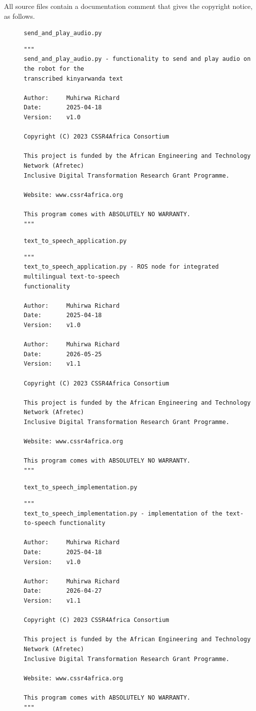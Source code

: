 \documentclass{CSSRforAfrica}
\newcommand{\checkboxChecked}{\fbox{\ding{51}}} %
\begin{document}
\noindent All source files contain a documentation comment that gives the copyright notice, as follows.

\begin{description}

\item[\checkboxChecked] {\small \verb+send_and_play_audio.py+}
{\scriptsize \begin{verbatim}
""" 
send_and_play_audio.py - functionality to send and play audio on the robot for the
transcribed kinyarwanda text

Author:     Muhirwa Richard
Date:       2025-04-18
Version:    v1.0

Copyright (C) 2023 CSSR4Africa Consortium

This project is funded by the African Engineering and Technology Network (Afretec)
Inclusive Digital Transformation Research Grant Programme.

Website: www.cssr4africa.org

This program comes with ABSOLUTELY NO WARRANTY.
"""
\end{verbatim} }

\item[\checkboxChecked] {\small \verb+text_to_speech_application.py+}
{\scriptsize \begin{verbatim}
"""
text_to_speech_application.py - ROS node for integrated multilingual text-to-speech
functionality

Author:     Muhirwa Richard
Date:       2025-04-18
Version:    v1.0

Author:     Muhirwa Richard
Date:       2026-05-25
Version:    v1.1

Copyright (C) 2023 CSSR4Africa Consortium

This project is funded by the African Engineering and Technology Network (Afretec)
Inclusive Digital Transformation Research Grant Programme.

Website: www.cssr4africa.org

This program comes with ABSOLUTELY NO WARRANTY.
"""
\end{verbatim} }

\item[\checkboxChecked] {\small \verb+text_to_speech_implementation.py+}
{\scriptsize \begin{verbatim}
"""
text_to_speech_implementation.py - implementation of the text-to-speech functionality

Author:     Muhirwa Richard
Date:       2025-04-18
Version:    v1.0

Author:     Muhirwa Richard
Date:       2026-04-27
Version:    v1.1

Copyright (C) 2023 CSSR4Africa Consortium

This project is funded by the African Engineering and Technology Network (Afretec)
Inclusive Digital Transformation Research Grant Programme.

Website: www.cssr4africa.org

This program comes with ABSOLUTELY NO WARRANTY.
"""
\end{verbatim} }

\end{description}
\end{document}
